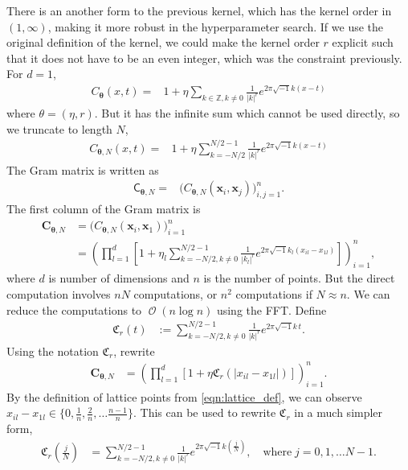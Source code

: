 \documentclass{iitthesis}          %
\DeclareMathOperator{\Order}{{\mathcal O}}
\newcommand{\bm}[1]{\boldsymbol{#1}}
\newcommand{\vtheta}{{\bm{\theta}}}
\newcommand{\vC}{\bm{C}}
\newcommand{\vx}{\bm{x}}
\newcommand{\mC}{\mathsf{C}}
\def\abs#1{\ensuremath{\left \lvert #1 \right \rvert}}
\begin{document}
\label{sec:trunc_series_kernel}
There is an another form to the previous kernel, which has the kernel order in $(1, \infty)$, making it more robust in the hyperparameter search.
If we use the original definition of the kernel, we could make the kernel order $r$ explicit such that it does not have to be an even integer, which was the constraint previously. For $d=1$,
\begin{align*}
C_\vtheta(x, t) = & 1 + \eta \sum_{k \in \mathbb{Z}, k \neq 0 } \frac{1}{\abs{k}^r} 
e^{ 2 \pi\sqrt{-1} k (x-t)}
\end{align*}
where $\theta = (\eta, r)$. 
But it has the infinite sum which cannot be used directly, so we truncate to length $N$,
\begin{align*}
C_{\vtheta, N}(x, t) = & 1 + \eta \sum_{k = - N/2 }^{N/2 - 1} \frac{1}{\abs{k}^r} 
e^{ 2 \pi\sqrt{-1} k (x-t)}
\end{align*}
The Gram matrix is written as 
\begin{align*}
\mC_{\vtheta, N} = & \biggl( C_{\vtheta, N}(\vx_i, \vx_j) \biggr)_{i,j=1}^n.
\end{align*}
The first column of the Gram matrix is
\begin{align*}
\vC_{\vtheta, N} &= \biggl( C_{\vtheta, N}(\vx_i, \vx_1) \biggr)_{i=1}^n
\\
&= \left( \prod_{l=1}^d \left[ 1 + \eta_l \sum_{k = - N/2, k \neq 0 }^{N/2 - 1} \frac{1}{\abs{k_l}^r} 
e^{ 2 \pi\sqrt{-1} k_l (x_{il}-x_{1l})}\right] \right)_{i=1}^n, 
\end{align*}
where $d$ is number of dimensions and $n$ is the number of points. 
But the direct computation involves $nN$ computations, or $n^2$ computations if $N \approx n$. We can reduce the computations to $\Order(n\log n)$ using the FFT.
Define
\begin{align*}
\mathfrak{C}_r(t) &:= \sum_{k = - N/2, k \neq 0 }^{N/2 -1} \frac{1}{\abs{k}^r} 
e^{ 2 \pi\sqrt{-1} k\, t}.
\end{align*}
Using the notation $\mathfrak{C}_r$, rewrite
\begin{align}
\label{eqn:trunc_series_kernel}
\vC_{\vtheta, N}
&= \left( \prod_{l=1}^d \left[ 1 + \eta \mathfrak{C}_r( \abs{x_{il} - x_{1l}})\right] \right)_{i=1}^n.
\end{align}
By the definition of lattice points from \eqref{eqn:lattice_def}, we can observe
$x_{il}-x_{1l} \in \lbrace 0, \frac 1n, \frac 2n, \dots \frac{n-1}{n}  \rbrace$. This can be used to rewrite $\mathfrak{C}_r$ in a much simpler form,
\begin{align*}
\mathfrak{C}_r \left(\frac jN \right) &= \sum_{k = - N/2, k \neq 0 }^{N/2 - 1} \frac{1}{\abs{k}^r} 
e^{ 2 \pi\sqrt{-1} k (\frac jN)}, \quad \text{where} \;  j=0,1,\dots N-1.
\end{align*}
\end{document}
